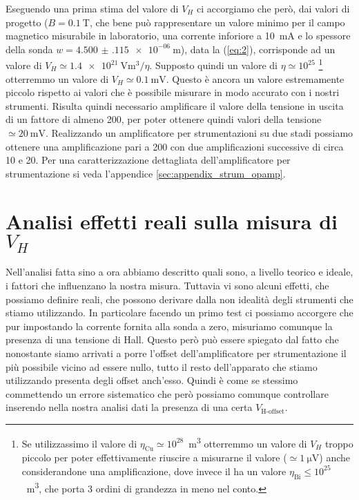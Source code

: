 \documentclass[
    prl,
    reprint, 
    superscriptaddress, 
    altaffilletter, 
    amsmath, 
    amssymb, 
    a4paper,
    varvw]{revtex4-2}
\begin{document}
Eseguendo una prima stima del valore di $V_H$ ci accorgiamo che però, dai valori di progetto ($B=\SI{0.1}{\tesla}$, che bene può rappresentare un valore minimo per il campo magnetico misurabile in laboratorio, una corrente inforiore a \SI{10}{\milli\ampere} e lo spessore della sonda $w=\SI{4.500(115)e-06}{\metre}$), data la (\ref{eq:2}), corrisponde ad un valore di $V_H \simeq\SI[exponent-mode = scientific]{1.4e21}{\volt\cubic\metre}/\eta$. Supposto quindi un valore di $\eta\simeq10^{25}$ \footnote{Se utilizzassimo il valore di $\eta_\text{Cu}\simeq10^{28}$\si{\per\cubic\metre} otterremmo un valore di $V_H$ troppo piccolo per poter effettivamente riuscire a misurarne il valore ($\simeq\SI{1}{\micro\volt}$) anche considerandone una amplificazione, dove invece il  ha un valore $\eta_\text{Bi}\leq10^{25}$ \si{\per\cubic\metre}, che porta 3 ordini di grandezza in meno nel conto.} otterremmo un valore di $V_H\simeq\SI{0.1}{\milli\volt}$. Questo è ancora un valore estremamente piccolo rispetto ai valori che è possibile misurare in modo accurato con i nostri strumenti. Risulta quindi necessario amplificare il valore della tensione in uscita di un fattore di almeno 200, per poter ottenere quindi valori della tensione $\simeq\SI{20}{\milli\volt}$. Realizzando un amplificatore per strumentazioni su due stadi possiamo ottenere una amplificazione pari a 200 con due amplificazioni successive di circa 10 e 20. Per una caratterizzazione dettagliata dell'amplificatore per strumentazione si veda l'appendice \ref{sec:appendix_strum_opamp}.

\section{Analisi effetti reali sulla misura di $V_H$}
Nell'analisi fatta sino a ora abbiamo descritto quali sono, a livello teorico e ideale, i fattori che influenzano la nostra misura. Tuttavia vi sono alcuni effetti, che possiamo definire reali, che possono derivare dalla non idealità degli strumenti che stiamo utilizzando. In particolare facendo un primo test ci possiamo accorgere che pur impostando la corrente fornita alla sonda a zero, misuriamo comunque la presenza di una tensione di Hall. Questo però può essere spiegato dal fatto che nonostante siamo arrivati a porre l'offset dell'amplificatore per strumentazione il più possibile vicino ad essere nullo, tutto il resto dell'apparato che stiamo utilizzando presenta degli offset anch'esso. Quindi è come se stessimo commettendo un errore sistematico che però possiamo comunque controllare inserendo nella nostra analisi dati la presenza di una certa $V_\text{H-offset}$. 
\end{document}

